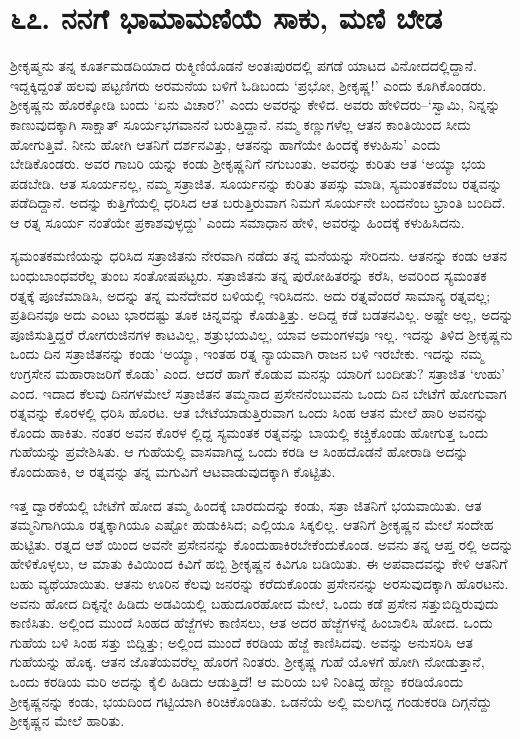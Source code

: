 
\chapter{೬೭. ನನಗೆ ಭಾಮಾಮಣಿಯೆ ಸಾಕು, ಮಣಿ ಬೇಡ}

ಶ್ರೀಕೃಷ್ಮನು ತನ್ನ ಕೂರ್ತಮಡದಿಯಾದ ರುಕ್ಮಿಣಿಯೊಡನೆ ಅಂತಃಪುರದಲ್ಲಿ ಪಗಡೆ ಯಾಟದ ವಿನೋದದಲ್ಲಿದ್ದಾನೆ. ಇದ್ದಕ್ಕಿದ್ದಂತೆ ಹಲವು ಪಟ್ಟಣಿಗರು ಅರಮನೆಯ ಬಳಿಗೆ ಓಡಿಬಂದು ‘ಪ್ರಭೋ, ಶ್ರೀಕೃಷ್ಣ!’ ಎಂದು ಕೂಗಿಕೊಂಡರು. ಶ್ರೀಕೃಷ್ಣನು ಹೊರಕ್ಕೋಡಿ ಬಂದು ‘ಏನು ವಿಚಾರ?’ ಎಂದು ಅವರನ್ನು ಕೇಳಿದ. ಅವರು ಹೇಳಿದರು–‘ಸ್ವಾಮಿ, ನಿನ್ನನ್ನು ಕಾಣುವುದಕ್ಕಾಗಿ ಸಾಕ್ಷಾತ್ ಸೂರ್ಯಭಗವಾನನೆ ಬರುತ್ತಿದ್ದಾನೆ. ನಮ್ಮ ಕಣ್ಣುಗಳೆಲ್ಲ ಆತನ ಕಾಂತಿಯಿಂದ ಸೀದು ಹೋಗುತ್ತಿವೆ. ನೀನು ಹೋಗಿ ಆತನಿಗೆ ದರ್ಶನವಿತ್ತು, ಆತನನ್ನು ಹಾಗೆಯೇ ಹಿಂದಕ್ಕೆ ಕಳುಹಿಸು’ ಎಂದು ಬೇಡಿಕೊಂಡರು. ಅವರ ಗಾಬರಿ ಯನ್ನು ಕಂಡು ಶ್ರೀಕೃಷ್ಣನಿಗೆ ನಗುಬಂತು. ಅವರನ್ನು ಕುರಿತು ಆತ ‘ಅಯ್ಯಾ ಭಯ ಪಡಬೇಡಿ. ಆತ ಸೂರ್ಯನಲ್ಲ, ನಮ್ಮ ಸತ್ರಾಜಿತ. ಸೂರ್ಯನನ್ನು ಕುರಿತು ತಪಸ್ಸು ಮಾಡಿ, ಸ್ಯಮಂತಕವೆಂಬ ರತ್ನವನ್ನು ಪಡೆದಿದ್ದಾನೆ. ಅದನ್ನು ಕುತ್ತಿಗೆಯಲ್ಲಿ ಧರಿಸಿದ ಆತ ಬರುತ್ತಿರುವಾಗ ನಿಮಗೆ ಸೂರ್ಯನೇ ಬಂದನೆಂಬ ಭ್ರಾಂತಿ ಬಂದಿದೆ. ಆ ರತ್ನ ಸೂರ್ಯ ನಂತೆಯೇ ಪ್ರಕಾಶವುಳ್ಳದ್ದು’ ಎಂದು ಸಮಾಧಾನ ಹೇಳಿ, ಅವರನ್ನು ಹಿಂದಕ್ಕೆ ಕಳುಹಿಸಿದನು.

ಸ್ಯಮಂತಕಮಣಿಯನ್ನು ಧರಿಸಿದ ಸತ್ರಾಜಿತನು ನೇರವಾಗಿ ನಡೆದು ತನ್ನ ಮನೆಯನ್ನು ಸೇರಿದನು. ಆತನನ್ನು ಕಂಡು ಆತನ ಬಂಧುಬಾಂಧವರೆಲ್ಲ ತುಂಬ ಸಂತೋಷಪಟ್ಟರು. ಸತ್ರಾಜಿತನು ತನ್ನ ಪುರೋಹಿತರನ್ನು ಕರೆಸಿ, ಅವರಿಂದ ಸ್ಯಮಂತಕ ರತ್ನಕ್ಕೆ ಪೂಜೆಮಾಡಿಸಿ, ಅದನ್ನು ತನ್ನ ಮನೆದೇವರ ಬಳಿಯಲ್ಲಿ ಇರಿಸಿದನು. ಅದು ರತ್ನವೆಂದರೆ ಸಾಮಾನ್ಯ ರತ್ನವಲ್ಲ; ಪ್ರತಿದಿನವೂ ಅದು ಎಂಟು ಭಾರದಷ್ಟು ತೂಕ ಚಿನ್ನವನ್ನು ಕೊಡುತ್ತಿತ್ತು. ಅದಿದ್ದ ಕಡೆ ಬಡತನವಿಲ್ಲ. ಅಷ್ಟೇ ಅಲ್ಲ, ಅದನ್ನು ಪೂಜಿಸುತ್ತಿದ್ದರೆ ರೋಗರುಜಿನಗಳ ಕಾಟವಿಲ್ಲ, ಶತ್ರುಭಯವಿಲ್ಲ, ಯಾವ ಅಮಂಗಳವೂ ಇಲ್ಲ. ಇದನ್ನು ತಿಳಿದ ಶ್ರೀಕೃಷ್ಣನು ಒಂದು ದಿನ ಸತ್ರಾಜಿತನನ್ನು ಕಂಡು ‘ಅಯ್ಯಾ, ಇಂತಹ ರತ್ನ ನ್ಯಾಯವಾಗಿ ರಾಜನ ಬಳಿ ಇರಬೇಕು. ಇದನ್ನು ನಮ್ಮ ಉಗ್ರಸೇನ ಮಹಾರಾಜರಿಗೆ ಕೊಡು’ ಎಂದ. ಆದರೆ ಹಾಗೆ ಕೊಡುವ ಮನಸ್ಸು ಯಾರಿಗೆ ಬಂದೀತು? ಸತ್ರಾಜಿತ ‘ಉಹು’ ಎಂದ. ಇದಾದ ಕೆಲವು ದಿನಗಳಮೇಲೆ ಸತ್ರಾಜಿತನ ತಮ್ಮನಾದ ಪ್ರಸೇನನೆಂಬುವನು ಒಂದು ದಿನ ಬೇಟೆಗೆ ಹೋಗುವಾಗ ರತ್ನವನ್ನು ಕೊರಳಲ್ಲಿ ಧರಿಸಿ ಹೊರಟ. ಆತ ಬೇಟೆಯಾಡುತ್ತಿರುವಾಗ ಒಂದು ಸಿಂಹ ಆತನ ಮೇಲೆ ಹಾರಿ ಅವನನ್ನು ಕೊಂದು ಹಾಕಿತು. ನಂತರ ಅವನ ಕೊರಳ ಲ್ಲಿದ್ದ ಸ್ಯಮಂತಕ ರತ್ನವನ್ನು ಬಾಯಲ್ಲಿ ಕಚ್ಚಿಕೊಂಡು ಹೋಗುತ್ತ ಒಂದು ಗುಹೆಯನ್ನು ಪ್ರವೇಶಿಸಿತು. ಆ ಗುಹೆಯಲ್ಲಿ ವಾಸವಾಗಿದ್ದ ಒಂದು ಕರಡಿ ಆ ಸಿಂಹದೊಡನೆ ಹೋರಾಡಿ ಅದನ್ನು ಕೊಂದುಹಾಕಿ, ಆ ರತ್ನವನ್ನು ತನ್ನ ಮಗುವಿಗೆ ಆಟವಾಡುವುದಕ್ಕಾಗಿ ಕೊಟ್ಟಿತು.

ಇತ್ತ ದ್ವಾರಕೆಯಲ್ಲಿ ಬೇಟೆಗೆ ಹೋದ ತಮ್ಮ ಹಿಂದಕ್ಕೆ ಬಾರದುದನ್ನು ಕಂಡು, ಸತ್ರಾ ಜಿತನಿಗೆ ಭಯವಾಯಿತು. ಆತ ತಮ್ಮನಿಗಾಗಿಯೂ ರತ್ನಕ್ಕಾಗಿಯೂ ಎಷ್ಟೋ ಹುಡುಕಿಸಿದ; ಎಲ್ಲಿಯೂ ಸಿಕ್ಕಲಿಲ್ಲ. ಆತನಿಗೆ ಶ್ರೀಕೃಷ್ಣನ ಮೇಲೆ ಸಂದೇಹ ಹುಟ್ಟಿತು. ರತ್ನದ ಆಶೆ ಯಿಂದ ಅವನೇ ಪ್ರಸೇನನನ್ನು ಕೊಂದುಹಾಕಿರಬೇಕೆಂದುಕೊಂಡ. ಅವನು ತನ್ನ ಆಪ್ತ ರಲ್ಲಿ ಅದನ್ನು ಹೇಳಿಕೊಳ್ಳಲು, ಆ ಮಾತು ಕಿವಿಯಿಂದ ಕಿವಿಗೆ ಹಬ್ಬಿ ಶ್ರೀಕೃಷ್ಣನ ಕಿವಿಗೂ ಬಡಿಯಿತು. ಈ ಅಪವಾದವನ್ನು ಕೇಳಿ ಆತನಿಗೆ ಬಹು ವ್ಯಥೆಯಾಯಿತು. ಆತನು ಊರಿನ ಕೆಲವು ಜನರನ್ನು ಕರೆದುಕೊಂಡು ಪ್ರಸೇನನನ್ನು ಅರಸುವುದಕ್ಕಾಗಿ ಹೊರಟನು. ಅವನು ಹೋದ ದಿಕ್ಕನ್ನೇ ಹಿಡಿದು ಅಡವಿಯಲ್ಲಿ ಬಹುದೂರಹೋದ ಮೇಲೆ, ಒಂದು ಕಡೆ ಪ್ರಸೇನ ಸತ್ತುಬಿದ್ದಿರುವುದು ಕಾಣಿಸಿತು. ಅಲ್ಲಿಂದ ಮುಂದೆ ಸಿಂಹದ ಹೆಜ್ಜೆಗಳು ಕಾಣಿಸಲು, ಆತ ಅದರ ಹೆಜ್ಜೆಗಳನ್ನೆ ಹಿಂಬಾಲಿಸಿ ಹೋದ. ಒಂದು ಗುಹೆಯ ಬಳಿ ಸಿಂಹ ಸತ್ತು ಬಿದ್ದಿತ್ತು; ಅಲ್ಲಿಂದ ಮುಂದೆ ಕರಡಿಯ ಹೆಜ್ಜೆ ಕಾಣಿಸಿದವು. ಅವನ್ನು ಅನುಸರಿಸಿ ಆತ ಗುಹೆಯನ್ನು ಹೊಕ್ಕ. ಆತನ ಜೊತೆಯವರೆಲ್ಲ ಹೊರಗೆ ನಿಂತರು. ಶ್ರೀಕೃಷ್ಣ ಗುಹೆ ಯೊಳಗೆ ಹೋಗಿ ನೋಡುತ್ತಾನೆ, ಒಂದು ಕರಡಿಯ ಮರಿ ಅದನ್ನು ಕೈಲಿ ಹಿಡಿದು ಆಡುತ್ತಿದೆ! ಆ ಮರಿಯ ಬಳಿ ನಿಂತಿದ್ದ ಹೆಣ್ಣು ಕರಡಿಯೊಂದು ಶ್ರೀಕೃಷ್ಣನನ್ನು ಕಂಡು, ಭಯದಿಂದ ಗಟ್ಟಿಯಾಗಿ ಕಿರಿಚಿಕೊಂಡಿತು. ಒಡನೆಯೆ ಅಲ್ಲಿ ಮಲಗಿದ್ದ ಗಂಡುಕರಡಿ ದಿಗ್ಗನೆದ್ದು ಶ್ರೀಕೃಷ್ಣನ ಮೇಲೆ ಹಾರಿತು.

